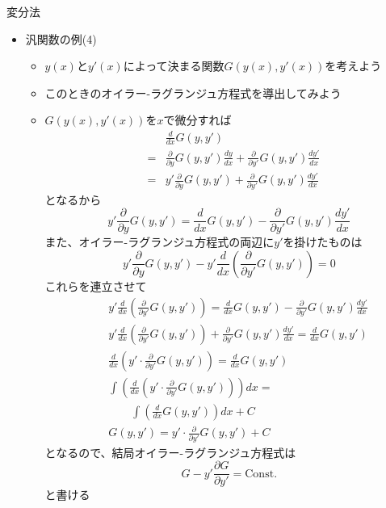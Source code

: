 \documentclass[dvipdfmx,notheorems,t]{beamer}
\begin{document}
\begin{frame}{変分法}

\begin{itemize}
	\item 汎関数の例(4)
	\begin{itemize}
		\item $y(x)$と$y'(x)$によって決まる関数\color{red}$G(y(x), y'(x))$\normalcolor を考えよう
		\item このときのオイラー-ラグランジュ方程式を導出してみよう
		\newline
		\item $G(y(x), y'(x))$を$x$で微分すれば
		\begin{eqnarray}
			&& \frac{d}{dx} G(y, y') \nonumber \\
			&=& \frac{\partial}{\partial y} G(y, y') \frac{dy}{dx} + \frac{\partial}{\partial y'} G(y, y') \frac{dy'}{dx} \\
			&=& y' \frac{\partial}{\partial y} G(y, y') + \frac{\partial}{\partial y'} G(y, y') \frac{dy'}{dx}
		\end{eqnarray}
		となるから
		\begin{equation}
			y' \frac{\partial}{\partial y} G(y, y') = \frac{d}{dx} G(y, y') - \frac{\partial}{\partial y'} G(y, y') \frac{dy'}{dx}
		\end{equation}
		また、オイラー-ラグランジュ方程式の両辺に$y'$を掛けたものは
		\begin{equation}
			y' \frac{\partial}{\partial y} G(y, y') - y' \frac{d}{dx} \left( \frac{\partial}{\partial y'} G(y, y') \right) = 0
		\end{equation}
		これらを連立させて
		\begin{eqnarray}
			&& y' \frac{d}{dx} \left( \frac{\partial}{\partial y'} G(y, y') \right) = \frac{d}{dx} G(y, y') - \frac{\partial}{\partial y'} G(y, y') \frac{dy'}{dx} \\
			&& y' \frac{d}{dx} \left( \frac{\partial}{\partial y'} G(y, y') \right) + \frac{\partial}{\partial y'} G(y, y') \frac{dy'}{dx} = \frac{d}{dx} G(y, y') \\
			&& \frac{d}{dx} \left( y' \cdot \frac{\partial}{\partial y'} G(y, y') \right) = \frac{d}{dx} G(y, y') \\
			&& \int \left( \frac{d}{dx} \left( y' \cdot \frac{\partial}{\partial y'} G(y, y') \right) \right) dx = \nonumber \\
			&& \qquad \int \left( \frac{d}{dx} G(y, y') \right) dx + C \\
			&& G(y, y') = y' \cdot \frac{\partial}{\partial y'} G(y, y') + C
		\end{eqnarray}
		となるので、結局オイラー-ラグランジュ方程式は
		\begin{equation}
			G - y' \frac{\partial G}{\partial y'} = \mathrm{Const.}
		\end{equation}
		と書ける
	\end{itemize}
\end{itemize}

\end{frame}
\end{document}
